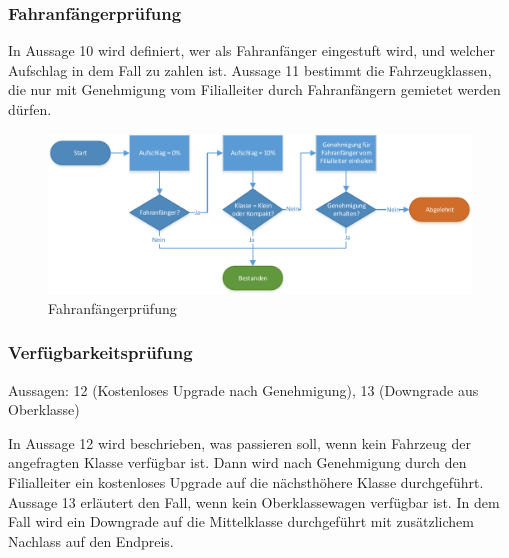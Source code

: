 \subsubsection{Fahranfängerprüfung}

In Aussage 10 wird definiert, wer als Fahranfänger eingestuft wird, und welcher Aufschlag in dem 
Fall zu zahlen ist. Aussage 11 bestimmt die Fahrzeugklassen, die nur mit Genehmigung vom Filialleiter
durch Fahranfängern gemietet werden dürfen.

\begin{figure}[H]
\centering
\includegraphics[width=0.8\linewidth]{Bilder/Fahranfaenger_pruefen}
\caption{Fahranfängerprüfung}
\label{fig:Fahranfänger_prüfen}
\end{figure}

\subsubsection{Verfügbarkeitsprüfung}

Aussagen: 12 (Kostenloses Upgrade nach Genehmigung), 13 (Downgrade aus Oberklasse)

In Aussage 12 wird beschrieben, was passieren soll, wenn kein Fahrzeug der angefragten Klasse
verfügbar ist. Dann wird nach Genehmigung durch den Filialleiter ein kostenloses Upgrade 
auf die nächsthöhere Klasse durchgeführt. 
Aussage 13 erläutert den Fall, wenn kein Oberklassewagen verfügbar ist. In dem Fall wird
ein Downgrade auf die Mittelklasse durchgeführt mit zusätzlichem Nachlass auf den Endpreis.

